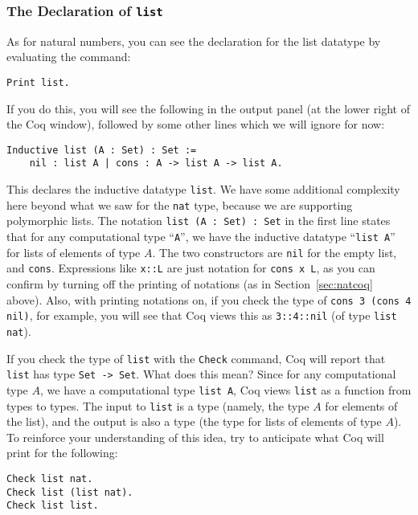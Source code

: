 \documentclass{book}[12pt]
\begin{document}
\subsubsection{The Declaration of \texttt{list}}

As for natural numbers, you can see the declaration for the list
datatype by evaluating the command:

\begin{verbatim}
Print list.
\end{verbatim}

\noindent If you do this, you will see the following in the output
panel (at the lower right of the Coq window), followed by some
other lines which we will ignore for now:

\begin{verbatim}
Inductive list (A : Set) : Set :=
    nil : list A | cons : A -> list A -> list A.
\end{verbatim}

\noindent This declares the inductive datatype \texttt{list}.  We have
some additional complexity here beyond what we saw for the
\texttt{nat} type, because we are supporting polymorphic lists.  The
notation \texttt{list (A : Set) : Set} in the first line states that
for any computational type ``\texttt{A}'', we have the inductive
datatype ``\texttt{list A}'' for lists of elements of type $A$.  The
two constructors are \texttt{nil} for the empty list, and
\texttt{cons}.  Expressions like \texttt{x::L} are just notation for
\texttt{cons x L}, as you can confirm by turning off the printing of
notations (as in Section~\ref{sec:natcoq} above).  Also, with printing
notations on, if you check the type of \texttt{cons 3 (cons 4 nil)}, for
example, you will see that Coq views this as \texttt{3::4::nil} (of
type \texttt{list nat}).

If you check the type of \texttt{list} with the \texttt{Check}
command, Coq will report that \texttt{list} has type \texttt{Set ->
Set}.  What does this mean?  Since for any computational type $A$, we
have a computational type \texttt{list A}, Coq views \texttt{list} as
a function from types to types.  The input to \texttt{list} is a type
(namely, the type $A$ for elements of the list), and the output is
also a type (the type for lists of elements of type $A$).  To
reinforce your understanding of this idea, try to anticipate what Coq
will print for the following:

\begin{verbatim}
Check list nat.
Check list (list nat).
Check list list.
\end{verbatim}
\end{document}
